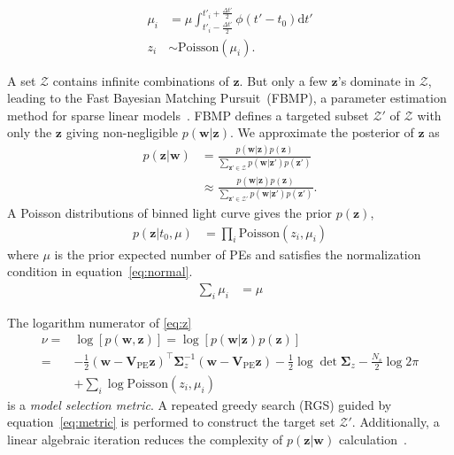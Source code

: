 \begin{equation}
  \begin{aligned}
    \mu_i &= \mu \int_{t'_i-\frac{\Delta t'}{2}}^{t'_i+\frac{\Delta t'}{2}} \phi(t' - t_0)\mathrm{d}t' \\
    z_i &\sim \mathrm{Poisson}(\mu_i).
  \end{aligned}
  \label{eq:poissonfbmp}
\end{equation}

A set $\mathcal{Z}$ contains infinite combinations of $\bm{z}$. But only a few $\bm{z}$'s dominate in $\mathcal{Z}$, leading to the Fast Bayesian Matching Pursuit~(FBMP), a parameter estimation method for sparse linear models~\cite{schniter_fast_2008}. FBMP defines a targeted subset $\mathcal{Z}'$ of $\mathcal{Z}$ with only the $\bm{z}$ giving non-negligible $p(\bm{w}|\bm{z})$. We approximate the posterior of $\bm{z}$ as 
\begin{equation}
    \label{eq:z}
    \begin{aligned}
    p(\bm{z}|\bm{w}) &= \frac{p(\bm{w}|\bm{z})p(\bm{z})}{\sum_{\bm{z}'\in\mathcal{Z}}p(\bm{w}|\bm{z'})p(\bm{z'})} \\
    &\approx \frac{p(\bm{w}|\bm{z})p(\bm{z})}{\sum_{\bm{z}'\in\mathcal{Z}'}p(\bm{w}|\bm{z'})p(\bm{z'})}.
    \end{aligned}
\end{equation}
A Poisson distributions of binned light curve gives the prior $p(\bm{z})$, 
\begin{equation}
\begin{aligned}
    p(\bm{z}|t_0, \mu) &= \prod_{i}\mathrm{Poisson}(z_i,\mu_i)
\end{aligned}
\end{equation}
where $\mu$ is the prior expected number of PEs and satisfies the normalization condition in equation~\eqref{eq:normal}. 
\begin{equation}
\label{eq:normal}
\begin{aligned}
  \sum_i \mu_i &= \mu
\end{aligned}
\end{equation}

The logarithm numerator of \eqref{eq:z}
\begin{equation}
    \label{eq:metric}
    \begin{aligned}
        \nu =& \log[p(\bm{w},\bm{z})] = \log[p(\bm{w}|\bm{z})p(\bm{z})] \\
        =& -\frac{1}{2}(\bm{w}-\bm{V}_\mathrm{PE}\bm{z})^\intercal\bm{\Sigma}_z^{-1}(\bm{w}-\bm{V}_\mathrm{PE}\bm{z})-\frac{1}{2}\log\det\bm{\Sigma}_z-\frac{N_s}{2}\log2\pi \\
        & +\sum_{i}\log{\mathrm{Poisson}(z_i,\mu_i)}
    \end{aligned}
\end{equation}
is a \textit{model selection metric}. A repeated greedy search (RGS) guided by equation~\eqref{eq:metric} is performed to construct the target set $\mathcal{Z}'$. Additionally, a linear algebraic iteration reduces the complexity of $p(\bm{z}|\bm{w})$ calculation~\cite{schniter_fast_2008}. 

